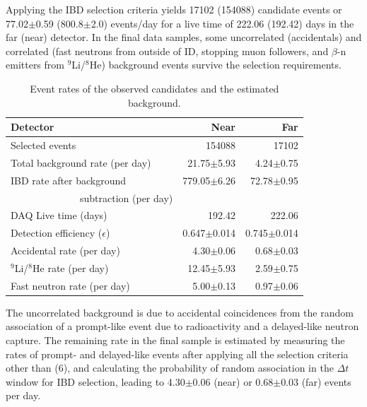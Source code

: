 \documentclass[aps,prl,twocolumn,superscriptaddress,showpacs]{revtex4-1}
\begin{document}
Applying the IBD selection criteria yields 17102 (154088) candidate events or 77.02$\pm$0.59 (800.8$\pm$2.0) events/day for a live time  of 222.06 (192.42) days in the far (near) detector. In the final data samples, some uncorrelated (accidentals) and correlated (fast neutrons from outside of ID, stopping muon followers, and $\beta$-n emitters from $^9$Li/$^8$He) background events survive the selection requirements. 
\begin{table}[hbt]
 \caption{Event rates of the observed candidates and the estimated background.}
 \begin{center}
 \begin{tabular*}{0.48\textwidth}{@{\extracolsep{\fill}} l r r }
 
  \hline \hline
     Detector              & Near       &  Far      \\
  \hline
 Selected events          &  154088     &   17102   \\
  
Total background rate (per day) &   21.75$\pm$5.93 &  4.24$\pm$0.75    \\
IBD rate after background       &   779.05$\pm$6.26 &  72.78$\pm$0.95   \\
~~~~~~~~~~~~~~subtraction (per day) &            &           \\
  \hline
DAQ Live time (days)       &   192.42      &    222.06    \\
Detection efficiency ($\epsilon$) & 0.647$\pm$0.014 & 0.745$\pm$0.014  \\
    \hline
  Accidental rate (per day)   &      4.30$\pm$0.06  &   0.68$\pm$0.03  \\
  $^9$Li/$^8$He rate (per day)&     12.45$\pm$5.93  &   2.59$\pm$0.75   \\
  Fast neutron rate (per day) &      5.00$\pm$0.13  &   0.97$\pm$0.06   \\
  \hline \hline
  \end{tabular*}
 \end{center}

 \label{tab:Event_rate}

 \end{table}

The uncorrelated background is due to accidental coincidences from the random association of a prompt-like event due to radioactivity and a delayed-like neutron capture. The remaining rate in the final sample is estimated by measuring the rates of prompt- and delayed-like events after applying all the selection criteria other than (6), and calculating the probability of random association in the 
$\Delta t $ window for IBD selection, leading to 4.30$\pm$0.06 (near) or 0.68$\pm$0.03 (far) events per day.
\end{document}
